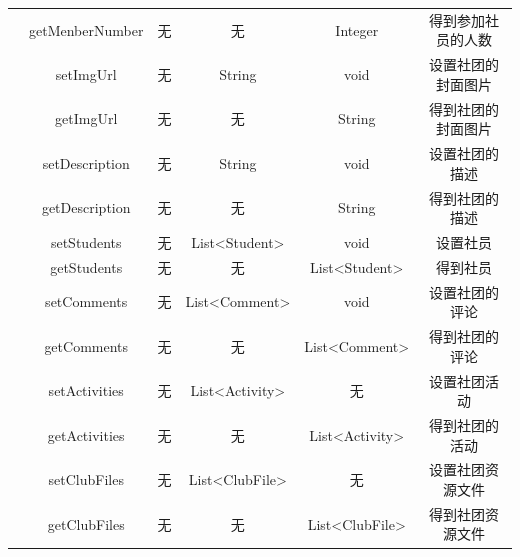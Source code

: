 \documentclass[UTF8]{ctexart}
\begin{document}
\begin{tabular}{|c|c|c|c|c|c|}
&getMenberNumber & 无 & 无 & Integer & 得到参加社员的人数\\
&setImgUrl & 无 & String & void & 设置社团的封面图片\\
&getImgUrl & 无 & 无 & String & 得到社团的封面图片\\
&setDescription & 无 & String & void & 设置社团的描述\\
&getDescription & 无 & 无 & String & 得到社团的描述\\
&setStudents & 无 & List<Student> & void & 设置社员\\
&getStudents & 无 & 无 & List<Student> & 得到社员\\
&setComments & 无 & List<Comment> & void & 设置社团的评论\\
&getComments & 无 & 无 & List<Comment> & 得到社团的评论\\
&setActivities & 无 & List<Activity> & 无 & 设置社团活动\\
&getActivities & 无 & 无 & List<Activity> & 得到社团的活动\\
&setClubFiles & 无 & List<ClubFile> & 无 & 设置社团资源文件\\
&getClubFiles & 无 & 无 & List<ClubFile> & 得到社团资源文件\\
\hline
\end{tabular}
\end{document}
